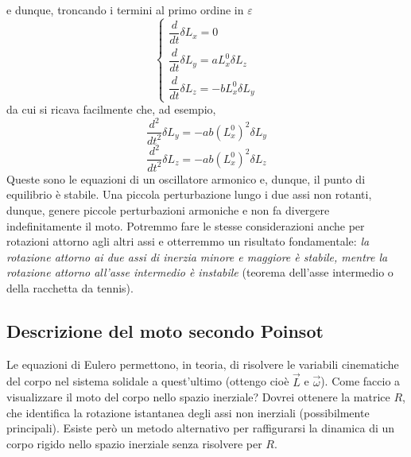 \documentclass[a4paper,openany]{article}
\begin{document}
	e dunque, troncando i termini al primo ordine in $\varepsilon$
	\begin{equation}\label{key}
		\begin{cases}
			\dfrac{d}{dt}\delta L_x =0\\
			\dfrac{d}{dt}\delta L_y = aL_x^{0}\delta L_z \\
			\dfrac{d}{dt}\delta L_z =- bL_x^{0}\delta L_y
		\end{cases}
	\end{equation}
	da cui si ricava facilmente che, ad esempio,
	\begin{equation}\label{key}
		\dfrac{d^2}{dt^2}\delta L_y = -ab (L_x^{0})^2\delta L_y
	\end{equation}
	\begin{equation}\label{key}
		\dfrac{d^2}{dt^2}\delta L_z = -ab (L_x^{0})^2\delta L_z
	\end{equation}
	Queste sono le equazioni di un oscillatore armonico e, dunque, il punto di equilibrio è stabile. Una piccola perturbazione lungo i due assi non rotanti, dunque, genere piccole perturbazioni armoniche e non fa divergere indefinitamente il moto. Potremmo fare le stesse considerazioni anche per rotazioni attorno agli altri assi e otterremmo un risultato fondamentale: \textit{la rotazione attorno ai due assi di inerzia minore e maggiore è stabile, mentre la rotazione attorno all'asse intermedio è instabile} (teorema dell'asse intermedio o della racchetta da tennis).
	\subsection{Descrizione del moto secondo Poinsot}
	Le equazioni di Eulero permettono, in teoria, di risolvere le variabili cinematiche del corpo nel sistema solidale a quest'ultimo (ottengo cioè $\vec{L}$ e $\vec{\omega}$). Come faccio a visualizzare il moto del corpo nello spazio inerziale? Dovrei ottenere la matrice $R$, che identifica la rotazione istantanea degli assi non inerziali (possibilmente principali). Esiste però un metodo alternativo per raffigurarsi la dinamica di un corpo rigido nello spazio inerziale senza risolvere per $R$.
	
\end{document}
